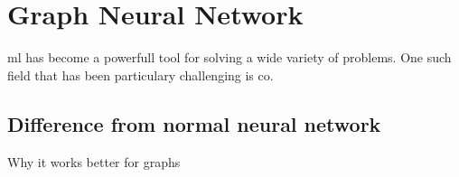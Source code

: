 \chapter{Graph Neural Network}

\gls{ml} has become a powerfull tool for solving a wide variety of problems. One such field that has been particulary challenging is \gls{co}. 

\section{Difference from normal neural network}

Why it works better for graphs
